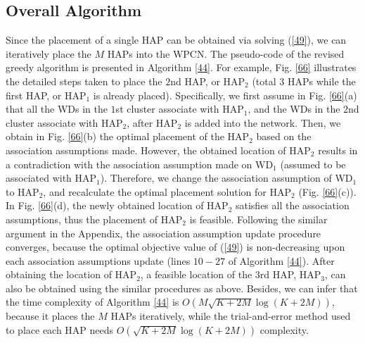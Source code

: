 \documentclass[journal, draftcls, one column, 12pt]{IEEEtran}
\begin{document}
\subsection{Overall Algorithm}
Since the placement of a single HAP can be obtained via solving (\ref{49}), we can iteratively place the $M$ HAPs into the WPCN. The pseudo-code of the revised greedy algorithm is presented in Algorithm \ref{44}. For example, Fig. \ref{66} illustrates the detailed steps taken to place the $2$nd HAP, or HAP$_2$ (total $3$ HAPs while the first HAP, or HAP$_1$ is already placed). Specifically, we first assume in Fig. \ref{66}(a) that all the WDs in the $1$st cluster associate with HAP$_1$, and the WDs in the $2$nd cluster associate with HAP$_2$, after HAP$_2$ is added into the network. Then, we obtain in Fig. \ref{66}(b) the optimal placement of the HAP$_2$ based on the association assumptions made. However, the obtained location of HAP$_2$ results in a contradiction with the association assumption made on WD$_1$ (assumed to be associated with HAP$_1$). Therefore, we change the association assumption of WD$_1$ to HAP$_2$, and recalculate the optimal placement solution for HAP$_2$ (Fig. \ref{66}(c)). In Fig. \ref{66}(d), the newly obtained location of HAP$_2$ satisfies all the association assumptions, thus the placement of HAP$_2$ is feasible. Following the similar argument in the Appendix, the association assumption update procedure converges, because the optimal objective value of (\ref{49}) is non-decreasing upon each association assumptions update (lines $10-27$ of Algorithm \ref{44}). After obtaining the location of HAP$_2$, a feasible location of the $3$rd HAP, HAP$_3$, can also be obtained using the similar procedures as above. Besides, we can infer that the time complexity of Algorithm \ref{44} is $O\left(M\sqrt{K+2M}\log\left(K+2M\right)\right)$, because it places the $M$ HAPs iteratively, while the trial-and-error method used to place each HAP needs $O\left(\sqrt{K+2M}\log\left(K+2M\right)\right)$ complexity.
\end{document}

